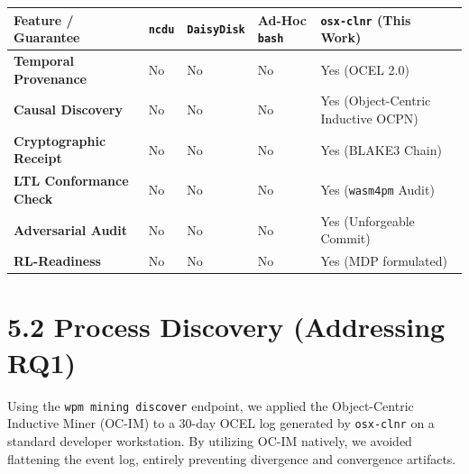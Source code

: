 \documentclass[
  12pt,
]{report}
\newcounter{none} %
\begin{document}
{\def\LTcaptype{none} %
\begin{longtable}[]{@{}
  >{\raggedright\arraybackslash}p{}
  >{\centering\arraybackslash}p{}
  >{\centering\arraybackslash}p{}
  >{\centering\arraybackslash}p{}
  >{\centering\arraybackslash}p{}@{}}
\toprule\noalign{}
\begin{minipage}[b]{\linewidth}\raggedright
Feature / Guarantee
\end{minipage} & \begin{minipage}[b]{\linewidth}\centering
\texttt{ncdu}
\end{minipage} & \begin{minipage}[b]{\linewidth}\centering
\texttt{DaisyDisk}
\end{minipage} & \begin{minipage}[b]{\linewidth}\centering
Ad-Hoc \texttt{bash}
\end{minipage} & \begin{minipage}[b]{\linewidth}\centering
\texttt{osx-clnr} (This Work)
\end{minipage} \\
\midrule\noalign{}
\endhead
\bottomrule\noalign{}
\endlastfoot
\textbf{Temporal Provenance} & No & No & No & Yes (OCEL 2.0) \\
\textbf{Causal Discovery} & No & No & No & Yes (Object-Centric Inductive
OCPN) \\
\textbf{Cryptographic Receipt} & No & No & No & Yes (BLAKE3 Chain) \\
\textbf{LTL Conformance Check} & No & No & No & Yes (\texttt{wasm4pm}
Audit) \\
\textbf{Adversarial Audit} & No & No & No & Yes (Unforgeable Commit) \\
\textbf{RL-Readiness} & No & No & No & Yes (MDP formulated) \\
\end{longtable}
}

\section{5.2 Process Discovery (Addressing
RQ1)}\label{process-discovery-addressing-rq1}

Using the \texttt{wpm\ mining\ discover} endpoint, we applied the
Object-Centric Inductive Miner (OC-IM) to a 30-day OCEL log generated by
\texttt{osx-clnr} on a standard developer workstation. By utilizing
OC-IM natively, we avoided flattening the event log, entirely preventing
divergence and convergence artifacts.
\end{document}
